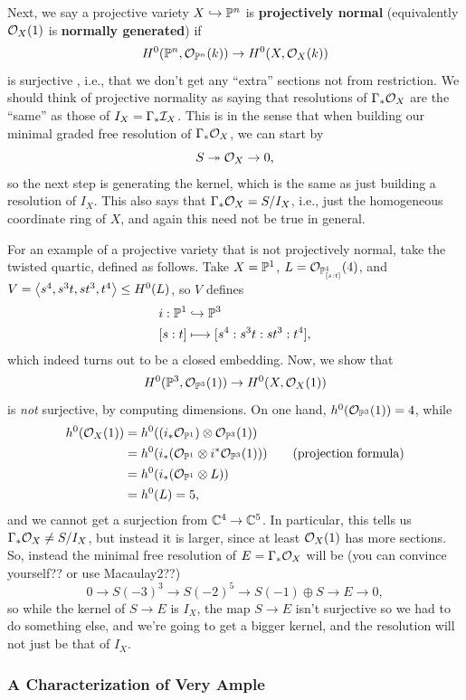 \documentclass[12pt]{article}
\begin{document}
Next, we say a projective variety $X\hookrightarrow \P^n$ is \textbf{projectively normal} (equivalently $\cO_X(1)$ is \textbf{normally generated}) if
\[H^0(\P^n, \cO_{\P^n}(k)) \to H^0(X, \cO_X(k))\]
is surjective , i.e., that we don't get any ``extra'' sections not from restriction. We should think of projective normality as saying that resolutions of $\Gamma_* \cO_X$ are the ``same'' as those of $I_X = \Gamma_* \cI_X$. This is in the sense that when building our minimal graded free resolution of $\Gamma_* \cO_X$, we can start by
\[S \twoheadrightarrow \cO_X \to 0,\]
so the next step is generating the kernel, which is the same as just building a resolution of $I_X$. This also says that $\Gamma_* \cO_X = S/I_X$, i.e., just the homogeneous coordinate ring of $X$, and again this need not be true in general.

For an example of a projective variety that is not projectively normal, take the twisted quartic, defined as follows. Take $X=\P^1$, $L=\cO_{\P^1_{[s:t]}}(4)$, and $V=\<s^4,s^3t,st^3,t^4\>\leq H^0(L)$, so $V$ defines
\begin{align*}
    i: \P^1 &\hookrightarrow \P^3\\
    [s:t] &\longmapsto [s^4:s^3t:st^3:t^4],
\end{align*}
which indeed turns out to be a closed embedding. Now, we show that
\[H^0(\P^3, \cO_{\P^3}(1)) \to H^0(X,\cO_X(1))\]
is \textit{not} surjective, by computing dimensions. On one hand, $h^0(\cO_{\P^3}(1))=4$, while
\begin{align*}
    h^0(\cO_X(1)) &= h^0((i_* \cO_{\P^1}) \otimes \cO_{\P^3}(1))\\
    &= h^0(i_*(\cO_{\P^1} \otimes i^* \cO_{\P^3}(1))) \tag{projection formula}\\
    &= h^0(i_*(\cO_{\P^1} \otimes L))\\
    &= h^0(L) = 5,
\end{align*}
and we cannot get a surjection from $\C^4 \to \C^5$. In particular, this tells us $\Gamma_* \cO_X \neq S/I_X$, but instead it is larger, since at least $\cO_X(1)$ has more sections. So, instead the minimal free resolution of $E=\Gamma_* \cO_X$ will be (you can convince yourself?? or use Macaulay2??)
\[0\to S(-3)^3 \to S(-2)^5 \to S(-1) \oplus S \to E\to 0,\]
so while the kernel of $S\to E$ is $I_X$, the map $S\to E$ isn't surjective so we had to do something else, and we're going to get a bigger kernel, and the resolution will not just be that of $I_X$.

\subsubsection{A Characterization of Very Ample}
\end{document}
